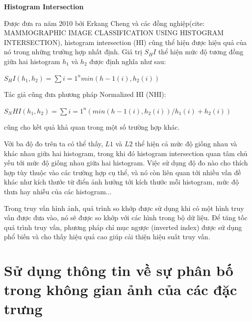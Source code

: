 \textbf{Histogram Intersection}

Được đưa ra năm 2010 bởi Erkang Cheng và các đồng nghiệp(cite: MAMMOGRAPHIC IMAGE CLASSIFICATION USING HISTOGRAM INTERSECTION), histogram intersection (HI) cũng thể hiện được hiệu quả của nó trong những trường hợp nhất định. Giá trị $S_HI$ thể hiện mức độ tương đồng giữa hai histogram $h_1$ và $h_2$ được định nghĩa như sau:

$S_HI(h_1, h_2) = \sum\limits{i = 1}^n	min(h-1(i), h_2(i))$

Tác giả cũng đưa phương pháp Normalized HI (NHI):

$S_NHI(h_1, h_2) = \sum\limits{i = 1}^n	(min(h-1(i), h_2(i))/h_1(i) + h_2(i))$

cũng cho kết quả khả quan trong một số trường hợp khác.

Với ba độ đo trên ta có thể thấy, $L1$ và $L2$ thể hiện cả mức độ giống nhau và khác nhau giữa hai histogram, trong khi đó histogram intersection quan tâm chủ yếu tới mức độ giống nhau giữa hai histogram.
Việc sử dụng độ đo nào cho thích hợp tùy thuộc vào các trường hợp cụ thể, và nó còn liên quan tới nhiều vấn đề khác như kích thước từ điển ảnh hưởng tới kích thước mỗi histogram, mức độ thưa hay nhiễu của các histogram...

Trong truy vấn hình ảnh, quá trình so khớp được sử dụng khi có một hình truy vấn được đưa vào, nó sẽ được so khớp với các hình trong bộ dữ liệu. Để tăng tốc quá trình truy vấn, phương pháp chỉ mục ngược (inverted index) được sử dụng phổ biến và cho thấy hiệu quả cao giúp cải thiện hiệu suất truy vấn.

\section{Sử dụng thông tin về sự phân bố trong không gian ảnh của các đặc trưng}
\label{spatial}


